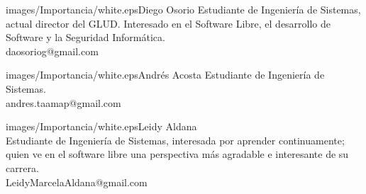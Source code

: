 \begin{multicols}{2}
\begin{bibliografia}
\end{bibliografia}


\begin{biografia}{images/Importancia/white.eps}{Diego Osorio} 
Estudiante de Ingeniería de Sistemas, actual director del GLUD. Interesado en el Software Libre, el desarrollo de Software y la Seguridad Informática.\\daosoriog@gmail.com
\end{biografia}

\begin{biografia}{images/Importancia/white.eps}{Andrés Acosta} 
Estudiante de Ingeniería de Sistemas.\\andres.taamap@gmail.com
\end{biografia}

\begin{biografia}{images/Importancia/white.eps}{Leidy Aldana} 
\\Estudiante de Ingeniería de Sistemas, interesada por aprender continuamente; quien ve en el software libre una perspectiva más agradable e interesante de su carrera.\\LeidyMarcelaAldana@gmail.com

\end{biografia}

\raggedcolumns
\pagebreak


\end{multicols}

\clearpage
\pagebreak
